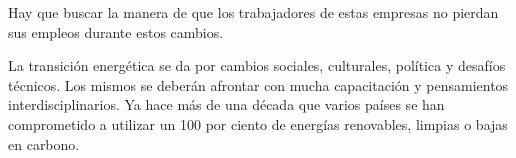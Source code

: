 \documentclass[runningheads]{llncs}
\begin{document}
Hay que buscar la manera de que los trabajadores de estas empresas no pierdan sus empleos durante estos cambios.\\ \par
La transición energética se da por cambios sociales, culturales, política y desafíos técnicos. Los mismos se deberán afrontar con mucha capacitación y pensamientos interdisciplinarios. Ya hace más de una década que varios países se han comprometido a utilizar un 100 por ciento de energías renovables, limpias o bajas en carbono.
\end{document}
